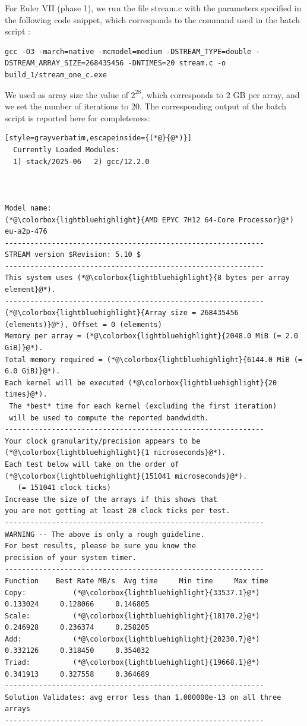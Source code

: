 \documentclass[unicode,10pt,a4paper,oneside,numbers=endperiod,openany]{scrartcl}
\begin{document}
For Euler VII (phase 1), we run the file stream.c with the parameters specified in the following code snippet, which corresponds to the command used in the batch script :
\begin{lstlisting}[style=grayverbatim]
gcc -O3 -march=native -mcmodel=medium -DSTREAM_TYPE=double -DSTREAM_ARRAY_SIZE=268435456 -DNTIMES=20 stream.c -o build_1/stream_one_c.exe
\end{lstlisting}
We used as array size the value of $2^{28}$, which corresponds to 2 GB per array, and we set the number of iterations to 20. The corresponding output of the batch script is reported here for completeness:
\begin{lstlisting}[style=grayverbatim,escapeinside={(*@}{@*)}]
  Currently Loaded Modules:
  1) stack/2025-06   2) gcc/12.2.0

 

Model name:                              (*@\colorbox{lightbluehighlight}{AMD EPYC 7H12 64-Core Processor}@*)
eu-a2p-476
-------------------------------------------------------------
STREAM version $Revision: 5.10 $
-------------------------------------------------------------
This system uses (*@\colorbox{lightbluehighlight}{8 bytes per array element}@*).
-------------------------------------------------------------
(*@\colorbox{lightbluehighlight}{Array size = 268435456 (elements)}@*), Offset = 0 (elements)
Memory per array = (*@\colorbox{lightbluehighlight}{2048.0 MiB (= 2.0 GiB)}@*).
Total memory required = (*@\colorbox{lightbluehighlight}{6144.0 MiB (= 6.0 GiB)}@*).
Each kernel will be executed (*@\colorbox{lightbluehighlight}{20 times}@*).
 The *best* time for each kernel (excluding the first iteration)
 will be used to compute the reported bandwidth.
-------------------------------------------------------------
Your clock granularity/precision appears to be (*@\colorbox{lightbluehighlight}{1 microseconds}@*).
Each test below will take on the order of (*@\colorbox{lightbluehighlight}{151041 microseconds}@*).
   (= 151041 clock ticks)
Increase the size of the arrays if this shows that
you are not getting at least 20 clock ticks per test.
-------------------------------------------------------------
WARNING -- The above is only a rough guideline.
For best results, please be sure you know the
precision of your system timer.
-------------------------------------------------------------
Function    Best Rate MB/s  Avg time     Min time     Max time
Copy:           (*@\colorbox{lightbluehighlight}{33537.1}@*)     0.133024     0.128066     0.146805
Scale:          (*@\colorbox{lightbluehighlight}{18170.2}@*)     0.246928     0.236374     0.258205
Add:            (*@\colorbox{lightbluehighlight}{20230.7}@*)     0.332126     0.318450     0.354032
Triad:          (*@\colorbox{lightbluehighlight}{19668.1}@*)     0.341913     0.327558     0.364689
-------------------------------------------------------------
Solution Validates: avg error less than 1.000000e-13 on all three arrays
-------------------------------------------------------------

\end{lstlisting}
\end{document}
